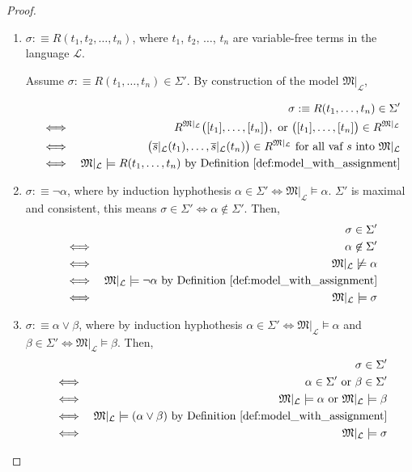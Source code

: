 \documentclass[11pt,letterpaper]{book}
\theoremstyle{definition}
\begin{document}
\begin{enumerate}
{\begin{proof}
\begin{enumerate}
\item{$\sigma :\equiv R(t_1 , t_2 , \ldots , t_n )$, where $t_1$, $t_2$,
$\ldots$, $t_n$ are variable-free terms in the language $\mathcal{L}$.

Assume $\sigma :\equiv R(t_1, \ldots, t_n) \in \Sigma'$. By construction
of the model $\mathfrak{M}|_{\mathcal{L}}$,

\begin{eqnarray*}
& & \sigma :\equiv R(t_1, \ldots, t_n) \in \Sigma' \\
& \iff & R^{\mathfrak{M}|_{\mathcal{L}}} \big( [t_1], \ldots, [t_n]
\big), \text{ or }  \big( [t_1], \ldots, [t_n] \big) \in
R^{\mathfrak{M}|_{\mathcal{L}}} \\
& \iff & \big( \overline{s}|_{\mathcal{L}} (t_1), \ldots,
\overline{s}|_{\mathcal{L}} (t_n) \big) \in 
R^{\mathfrak{M}|_{\mathcal{L}}} \text{ for
all vaf $s$ into $\mathfrak{M}|_{\mathcal{L}}$}  \\
& \iff & \mathfrak{M}|_{\mathcal{L}} \models R(t_1, \ldots, t_n)  \text{
by Definition \ref{def:model_with_assignment}}
\end{eqnarray*}
}

\item{$\sigma :\equiv \lnot \alpha$, where by induction hyphothesis
$\alpha \in \Sigma' \iff \mathfrak{M}|_{\mathcal{L}} \models \alpha $.
$\Sigma'$ is maximal and consistent, this means $\sigma \in \Sigma' \iff
\alpha \not \in \Sigma'$. Then,
\begin{eqnarray*}
& & \sigma \in \Sigma' \\
& \iff & \alpha \not \in \Sigma' \\
& \iff & \mathfrak{M}|_{\mathcal{L}} \not \models \alpha \\
& \iff & \mathfrak{M}|_{\mathcal{L}} \models \lnot \alpha \text{ by
Definition \ref{def:model_with_assignment}} \\
& \iff & \mathfrak{M}|_{\mathcal{L}} \models \sigma
\end{eqnarray*}

}

\item{$\sigma : \equiv \alpha \lor \beta$, where by induction
hyphothesis  $\alpha \in \Sigma' \iff \mathfrak{M}|_{\mathcal{L}}
\models \alpha $ and $\beta \in \Sigma' \iff \mathfrak{M}|_{\mathcal{L}}
\models \beta $. Then,
\begin{eqnarray*}
& & \sigma \in \Sigma' \\
& \iff & \alpha \in \Sigma' \text{ or } \beta \in \Sigma' \\
& \iff & \mathfrak{M}|_{\mathcal{L}} \models \alpha \text{ or }
\mathfrak{M}|_{\mathcal{L}} \models \beta \\
& \iff & \mathfrak{M}|_{\mathcal{L}} \models (\alpha \lor \beta) \text{
by Definition \ref{def:model_with_assignment}} \\
& \iff & \mathfrak{M}|_{\mathcal{L}} \models \sigma
\end{eqnarray*}
}
\end{enumerate}


\end{proof}}
\end{enumerate}
\end{document}
